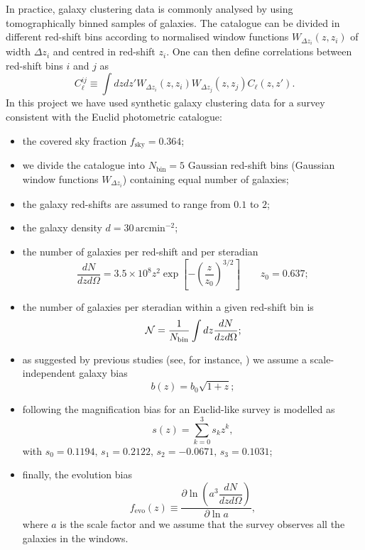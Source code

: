 In practice, galaxy clustering data is commonly analysed by using tomographically binned samples of galaxies. The catalogue can be divided in different red-shift bins according to normalised window functions $W_{\Delta z_i}(z,z_i)$ of width $\Delta z_i$ and centred in red-shift $z_i$. One can then define correlations between red-shift bins $i$ and $j$ as
\begin{equation}
\label{Eq:binned-angular-matter-power-spectrum}
C_\ell^{ij} \equiv \int dz dz' W_{\Delta z_i}(z,z_i) W_{\Delta z_j}(z,z_j) C_\ell (z,z').
\end{equation} 
In this project we have used synthetic galaxy clustering data for a survey consistent with the Euclid photometric catalogue:
\begin{itemize}
\item the covered sky fraction $f_{\mathrm{sky}}=0.364$; 
\item we divide the catalogue into $N_{\mathrm{bin}}=5$ Gaussian red-shift bins (Gaussian window functions $W_{\Delta z_i}$) containing equal number of galaxies;
\item the galaxy red-shifts are assumed to range from $0.1$ to $2$;
\item the galaxy density $d=30\,\mathrm{arcmin^{-2}}$;
\item the number of galaxies per red-shift and per steradian 
\begin{equation}
\label{Eq:dNdzdOmega}
\dfrac{dN}{dzd\Omega} = 3.5\times 10^8 z^2 \exp \left[-\left( \frac{z}{z_0} \right)^{3/2} \right] \qquad z_0=0.637; 
\end{equation}
\item the number of galaxies per steradian within a given red-shift bin is 
\begin{equation}
\label{Eq:number-galaxies-per-bin}
\,{\mathcal N} = \frac{1}{N_{\mathrm{bin}}}\int dz \dfrac{dN}{dzd\Omega};
\end{equation}
\item as suggested by previous studies (see, for instance, ) we assume a scale-independent galaxy bias 
\begin{equation}
b(z) = b_0\sqrt{1+z};
\label{Eq:galaxy-bias}
\end{equation}
\item following  the magnification bias for an Euclid-like survey is modelled as 
\begin{equation}
s(z) = \sum_{k=0}^3 s_k z^k,
\label{Eq:magnification-bias}
\end{equation}
with $s_0 = 0.1194,\, s_1 = 0.2122,\, s_2 = -0.0671,\, s_3 = 0.1031$;
\item finally, the evolution bias 
\begin{equation}
f_{\mathrm{evo}}(z) \equiv \dfrac{\partial \ln \left( a^3 \dfrac{dN}{dzd\Omega}  \right)}{\partial \ln a},
\label{Eq:evolution-bias}
\end{equation}    
where $a$ is the scale factor and we assume that the survey observes all the galaxies in the windows.
\end{itemize}   

